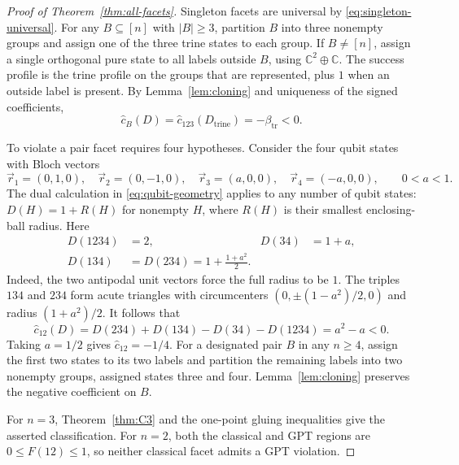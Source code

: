 \documentclass[10pt,a4paper]{amsart}
\newcommand{\1}{\mathbf 1}
\newcommand{\btr}{\beta_{\mathrm{tr}}}
\begin{document}
\begin{proof}[Proof of Theorem~\ref{thm:all-facets}]
Singleton facets are universal by \eqref{eq:singleton-universal}. For any
$B\subseteq[n]$ with $|B|\ge3$, partition $B$ into three nonempty groups and
assign one of the three trine states to each group. If $B\ne[n]$, assign a
single orthogonal pure state to all labels outside $B$, using
$\mathbb C^2\oplus\mathbb C$. The success profile is the trine profile on the
groups that are represented, plus $1$ when an outside label is present.
By Lemma~\ref{lem:cloning} and uniqueness of the signed coefficients,
\begin{equation}\label{eq:trine-lift}
 \widehat c_B(D)=\widehat c_{123}(D_{\mathrm{trine}})=-\btr<0.
\end{equation}

To violate a pair facet requires four hypotheses. Consider the four qubit
states with Bloch vectors
\begin{equation}\label{eq:four-qubit-vectors}
 \vec r_1=(0,1,0),\quad \vec r_2=(0,-1,0),\quad
 \vec r_3=(a,0,0),\quad \vec r_4=(-a,0,0),\qquad 0<a<1.
\end{equation}
The dual calculation in \eqref{eq:qubit-geometry} applies to any number of qubit
states: $D(H)=1+R(H)$ for nonempty $H$, where $R(H)$ is their smallest
enclosing-ball radius. Here
\begin{align}
 D(1234)&=2, & D(34)&=1+a,\nonumber\\
 D(134)&=D(234)=1+\frac{1+a^2}{2}.\label{eq:four-qubit-success}
\end{align}
Indeed, the two antipodal unit vectors force the full radius to be $1$.
The triples $134$ and $234$ form acute triangles with circumcenters
$(0,\pm(1-a^2)/2,0)$ and radius $(1+a^2)/2$. It follows that
\begin{equation}\label{eq:negative-pair}
 \widehat c_{12}(D)
 =D(234)+D(134)-D(34)-D(1234)=a^2-a<0.
\end{equation}
Taking $a=1/2$ gives $\widehat c_{12}=-1/4$.
For a designated pair $B$ in any $n\ge4$, assign the first two states to its
two labels and partition the remaining labels into two nonempty groups,
assigned states three and four. Lemma~\ref{lem:cloning} preserves the negative
coefficient on $B$.

For $n=3$, Theorem~\ref{thm:C3} and the one-point gluing inequalities give the
asserted classification. For $n=2$, both the classical and GPT regions are
$0\le F(12)\le1$, so neither classical facet admits a GPT violation.
\end{proof}
\end{document}
